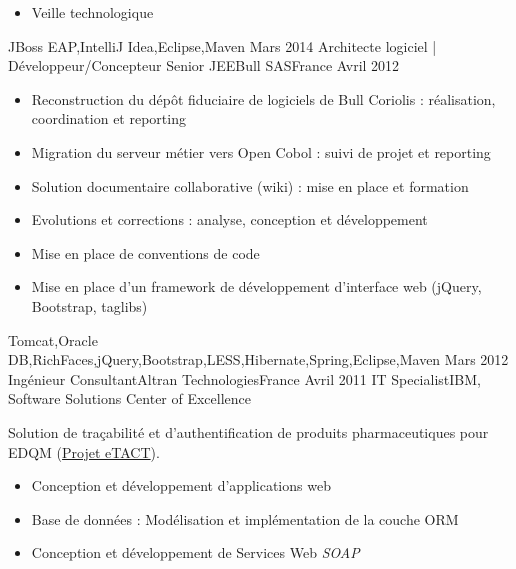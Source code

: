 \begin{experiences}
{\begin{itemize}
                        \item Veille technologique                                                                    
                      \end{itemize}
                    }
                    {JBoss EAP,IntelliJ Idea,Eclipse,Maven}
  \emptySeparator
  \experience
    {Mars 2014}     {Architecte logiciel | Développeur/Concepteur Senior JEE}{Bull SAS}{France}
    {Avril 2012}    {
                      \begin{itemize}
                        \item Reconstruction du dépôt fiduciaire de logiciels de Bull Coriolis : réalisation, coordination et reporting
                        \item Migration du serveur métier vers Open Cobol : suivi de projet et reporting                
                        \item Solution documentaire collaborative (wiki) : mise en place et formation                   
                        \item Evolutions et corrections : analyse, conception et développement                          
                        \item Mise en place de conventions de code                                                      
                        \item Mise en place d'un framework de développement d'interface web (jQuery, Bootstrap, taglibs)
                      \end{itemize}
                    }
                    {Tomcat,Oracle DB,RichFaces,jQuery,Bootstrap,LESS,Hibernate,Spring,Eclipse,Maven}
  \emptySeparator
  \consultantexperience
  {Mars 2012}       {Ingénieur Consultant}{Altran Technologies}{France}
  {Avril 2011}      {IT Specialist}{IBM, Software Solutions Center of Excellence}
                    {
                      Solution de traçabilité et d'authentification de produits pharmaceutiques pour EDQM (\href{https://www.edqm.eu/fr/eTACT-1466.html}{Projet eTACT}).
                      \begin{itemize}
                        \item Conception et développement d'applications web                               
                        \item Base de données : Modélisation et implémentation de la couche ORM            
                        \item Conception et développement de Services Web \emph{SOAP}                      

\end{itemize}}
\end{experiences}
